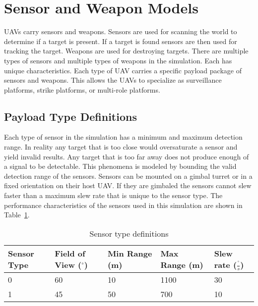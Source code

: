 \section{Sensor and Weapon Models}
\label{sec:sensor_wpn_models}
UAVs carry sensors and weapons.  Sensors are used for scanning the world to determine if a target is present.  If a target is found sensors are then used for tracking the target.  Weapons are used for destroying targets.  There are multiple types of sensors and multiple types of weapons in the simulation.  Each has unique characteristics.  Each type of UAV carries a specific payload package of sensors and weapons.  This allows the UAVs to specialize as surveillance platforms, strike platforms, or multi-role platforms.

\subsection{Payload Type Definitions}

Each type of sensor in the simulation has a minimum and maximum detection range.  In reality any target that is too close would oversaturate a sensor and yield invalid results.  Any target that is too far away does not produce enough of a signal to be detectable.  This phenomena is modeled by bounding the valid detection range of the sensors.  Sensors can be mounted on a gimbal turret or in a fixed orientation on their host UAV.  If they are gimbaled the sensors cannot slew faster than a maximum slew rate that is unique to the sensor type. The performance characteristics of the sensors used in this simulation are shown in Table~\ref{tab:sensorType}.

\begin{table}[H]
	\caption{Sensor type definitions}
	\centering
	\label{tab:sensorType}
	\begin{tabular}{|p{1cm}|p{1.5cm}|p{1cm}|p{1cm}|p{1.5cm}|}
		\hline
		Sensor Type & Field of View ($^{\circ}$) & Min Range (m) & Max Range (m) & Slew rate ($\frac{^{\circ}}{s}$)\\ \hline
		0 & 60 & 10 & 1100 & 30 \\  \hline
		1 & 45 & 50 & 700  & 10 \\  \hline
	\end{tabular}
\end{table}

